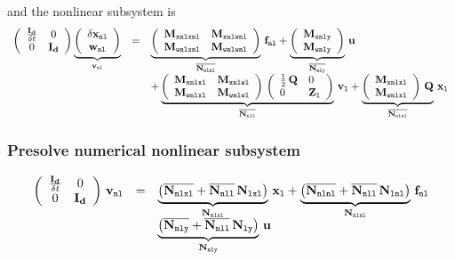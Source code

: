 \documentclass[10pt,a4paper]{article}
\begin{document}
{and the nonlinear subsystem is 
%
\begin{equation}
\begin{array}{rcl}
\left(
\begin{array}{cc}
\frac{\mathbf{I_d}}{\delta t} & 0 \\
0 & \mathbf{I_d}
\end{array}
\right)\underbrace{\left(\begin{array}{c}
\delta {\mathbf{x}}_{\mathtt{nl}} \\
{\mathbf{w}}_{\mathtt{nl}}
\end{array}\right) 
}_{\mathbf{v}_{\mathtt{nl}}}
&=&
  \underbrace{\left(\begin{array}{ll}
\mathbf{M}_{\mathtt{xnlxnl}}& \mathbf{M}_{\mathtt{xnlwnl}} \\ 
 \mathbf{M}_{\mathtt{wnlxnl}}& \mathbf{M}_{\mathtt{wnlwnl}} 
\end{array}\right)}_{\overline{\mathbf{N}_{\mathtt{nlnl}}}}
\,
\mathbf{f}_{\mathtt{nl}}
+
  \underbrace{\left(\begin{array}{l}
 \mathbf{M}_{\mathtt{xnly}}\\ 
 \mathbf{M}_{\mathtt{wnly}}
\end{array}\right)}_{\overline{\mathbf{N}_{\mathtt{nly}}}}
\,
{\mathbf{u}} \\
 && +
\underbrace{ \left(\begin{array}{ll}
\mathbf{M}_{\mathtt{xnlxl}}&\mathbf{M}_{\mathtt{xnlwl}} \\ 
\mathbf{M}_{\mathtt{wnlxl}}&\mathbf{M}_{\mathtt{wnlwl}} 
\end{array}\right)\,\left(\begin{array}{ll}
\frac{1}{2}\,\mathbf{Q}&0 \\ 
0 &\mathbf{Z}_{\mathtt{l}}
\end{array}\right)}_{\overline{\mathbf{N}_{\mathtt{nll}}}}
\, 
\mathbf{v}_{\mathtt{l}}
+
\underbrace{\left(\begin{array}{ll}
\mathbf{M}_{\mathtt{xnlxl}}\\ 
\mathbf{M}_{\mathtt{wnlxl}}
\end{array}\right)\,\mathbf{Q}}_{\overline{\mathbf{N}_{\mathtt{nlxl}}}}
\, 
{\mathbf{x}}_{\mathtt{l}}
\end{array}
\end{equation}
\subsubsection{Presolve numerical nonlinear subsystem}
\begin{equation}
\begin{array}{rcl}
\left(
\begin{array}{cc}
\frac{\mathbf{I_d}}{\delta t} & 0 \\
0 & \mathbf{I_d}
\end{array}
\right)\,
\mathbf{v}_{\mathtt{nl}} &=& \underbrace{\left(\overline{\mathbf{N}_{\mathtt{nlxl}}} + \overline{\mathbf{N}_{\mathtt{nll}}}\,{\mathbf{N}_{\mathtt{lxl}}}\right)}_{\mathbf{N}_{\mathtt{nlxl}}}\,{\mathbf{x}}_{\mathtt{l}} + \underbrace{\left(\overline{\mathbf{N}_{\mathtt{nlnl}}} + \overline{\mathbf{N}_{\mathtt{nll}}}\,{\mathbf{N}_{\mathtt{lnl}}}\right)}_{\mathbf{N}_{\mathtt{nlnl}}}\,\mathbf{f}_{\mathtt{nl}}\\
&& \underbrace{\left(\overline{\mathbf{N}_{\mathtt{nly}}}+ \overline{\mathbf{N}_{\mathtt{nll}}}\,{\mathbf{N}_{\mathtt{ly}}}\right)}_{\mathbf{N}_{\mathtt{nly}}}\,{\mathbf{u}}
\end{array}
\end{equation}
%
}
\end{document}
